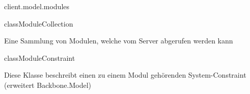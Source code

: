 \begin{texdocpackage}{client.model.modules}
\begin{texdocclass}{class}{ModuleCollection}
\label{texdoclet:edu.kit.informatik.studyplan.client.model.modules.ModuleCollection}
\begin{texdocclassintro}
Eine Sammlung von Modulen, welche vom Server abgerufen werden kann\end{texdocclassintro}
\begin{texdocclassfields}
\end{texdocclassfields}
\begin{texdocclassconstructors}
\end{texdocclassconstructors}
\begin{texdocclassmethods}
\end{texdocclassmethods}
\end{texdocclass}


\begin{texdocclass}{class}{ModuleConstraint}
\label{texdoclet:edu.kit.informatik.studyplan.client.model.modules.ModuleConstraint}
\begin{texdocclassintro}
Diese Klasse beschreibt einen zu einem Modul gehörenden System-Constraint
 (erweitert Backbone.Model)\end{texdocclassintro}
\begin{texdocclassfields}
\end{texdocclassfields}
\begin{texdocclassconstructors}
\end{texdocclassconstructors}
\end{texdocclass}



\end{texdocpackage}
